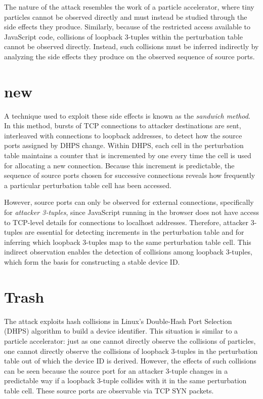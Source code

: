 \documentclass{report}
\begin{document}
The nature of the attack resembles the work of a \alert{particle accelerator}, where tiny particles cannot be observed directly and must instead be studied through the side effects they produce. Similarly, because of the restricted access available to JavaScript code, collisions of loopback 3-tuples within the perturbation table \alert{cannot be observed directly}. Instead, such collisions must be inferred indirectly by analyzing the side effects they produce on the observed sequence of source ports.

\section{new}
\label{sec:new}

A technique used to exploit these side effects is known as the \emph{sandwich method}. In this method, bursts of TCP connections to attacker destinations are sent, interleaved with connections to loopback addresses, to detect how the source ports assigned by DHPS change. Within DHPS, each cell in the perturbation table maintains a counter that is incremented by one every time the cell is used for allocating a new connection. Because this increment is predictable, the sequence of source ports chosen for successive connections reveals how frequently a particular perturbation table cell has been accessed.

However, source ports can only be observed for external connections, specifically for \emph{attacker 3-tuples}, since JavaScript running in the browser does not have access to TCP-level details for connections to localhost addresses. Therefore, attacker 3-tuples are essential for detecting increments in the perturbation table and for inferring which loopback 3-tuples map to the same perturbation table cell. This indirect observation enables the detection of collisions among loopback 3-tuples, which form the basis for constructing a stable device ID.

\section {Trash}
\label{sec:trash}

The attack exploits hash collisions in Linux’s Double-Hash Port Selection (DHPS) algorithm to build a device identifier. This situation is similar to a particle accelerator: just as one cannot directly observe the collisions of particles, one cannot directly observe the collisions of loopback 3-tuples in the perturbation table out of which the device ID is derived. However, the effects of such collisions can be seen because the source port for an attacker 3-tuple changes in a predictable way if a loopback 3-tuple collides with it in the same perturbation table cell. These source ports are observable via TCP SYN packets.
\end{document}
